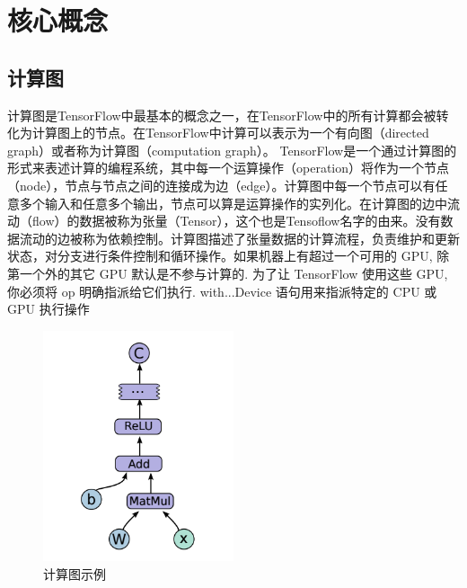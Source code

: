 	\section{核心概念}
		\subsection{计算图}
		计算图是TensorFlow中最基本的概念之一，在TensorFlow中的所有计算都会被转化为计算图上的节点。在TensorFlow中计算可以表示为一个有向图（directed graph）或者称为计算图（computation graph）。 
		TensorFlow是一个通过计算图的形式来表述计算的编程系统，其中每一个运算操作（operation）将作为一个节点（node），节点与节点之间的连接成为边（edge）。计算图中每一个节点可以有任意多个输入和任意多个输出，节点可以算是运算操作的实列化。在计算图的边中流动（flow）的数据被称为张量（Tensor），这个也是Tensoflow名字的由来。没有数据流动的边被称为依赖控制。计算图描述了张量数据的计算流程，负责维护和更新状态，对分支进行条件控制和循环操作。如果机器上有超过一个可用的 GPU, 除第一个外的其它 GPU 默认是不参与计算的. 为了让 TensorFlow 使用这些 GPU, 你必须将 op 明确指派给它们执行. with...Device 语句用来指派特定的 CPU 或 GPU 执行操作
		\begin{figure}[!ht]
			\centering
			\includegraphics[width=0.5\textwidth]{figures/2-2}
			\caption{计算图示例}
		\end{figure}
		
